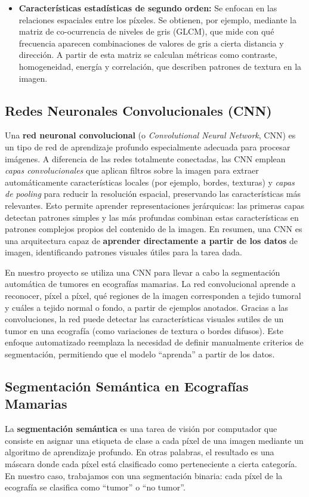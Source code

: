 \documentclass[12pt]{article}
\begin{document}
\begin{itemize}
  \item \textbf{Características estadísticas de segundo orden:} Se enfocan en las relaciones espaciales entre los píxeles. Se obtienen, por ejemplo, mediante la matriz de co-ocurrencia de niveles de gris (GLCM), que mide con qué frecuencia aparecen combinaciones de valores de gris a cierta distancia y dirección. A partir de esta matriz se calculan métricas como contraste, homogeneidad, energía y correlación, que describen patrones de textura en la imagen.
\end{itemize}

\subsection{Redes Neuronales Convolucionales (CNN)} 
Una \textbf{red neuronal convolucional} (o \textit{Convolutional Neural Network}, CNN) es un tipo de red de aprendizaje profundo especialmente adecuada para procesar imágenes. A diferencia de las redes totalmente conectadas, las CNN emplean \textit{capas convolucionales} que aplican filtros sobre la imagen para extraer automáticamente características locales (por ejemplo, bordes, texturas) y \textit{capas de pooling} para reducir la resolución espacial, preservando las características más relevantes. Esto permite aprender representaciones jerárquicas: las primeras capas detectan patrones simples y las más profundas combinan estas características en patrones complejos propios del contenido de la imagen. En resumen, una CNN es una arquitectura capaz de \textbf{aprender directamente a partir de los datos} de imagen, identificando patrones visuales útiles para la tarea dada.

En nuestro proyecto se utiliza una CNN para llevar a cabo la segmentación automática de tumores en ecografías mamarias. La red convolucional aprende a reconocer, píxel a píxel, qué regiones de la imagen corresponden a tejido tumoral y cuáles a tejido normal o fondo, a partir de ejemplos anotados. Gracias a las convoluciones, la red puede detectar las características visuales sutiles de un tumor en una ecografía (como variaciones de textura o bordes difusos). Este enfoque automatizado reemplaza la necesidad de definir manualmente criterios de segmentación, permitiendo que el modelo ``aprenda'' a partir de los datos.

\subsection*{Segmentación Semántica en Ecografías Mamarias}  
La \textbf{segmentación semántica} es una tarea de visión por computador que consiste en asignar una etiqueta de clase a cada píxel de una imagen mediante un algoritmo de aprendizaje profundo. En otras palabras, el resultado es una máscara donde cada píxel está clasificado como perteneciente a cierta categoría. En nuestro caso, trabajamos con una segmentación binaria: cada píxel de la ecografía se clasifica como “tumor” o “no tumor”.
\end{document}
